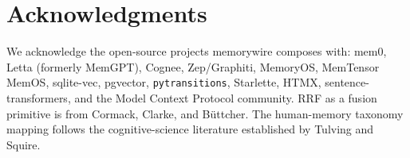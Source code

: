 \documentclass[11pt,letterpaper,twocolumn]{article}
\begin{document}
\section*{Acknowledgments}

We acknowledge the open-source projects memorywire composes with: mem0, Letta (formerly MemGPT), Cognee, Zep/Graphiti, MemoryOS, MemTensor MemOS, sqlite-vec, pgvector, \texttt{pytransitions}, Starlette, HTMX, sentence-transformers, and the Model Context Protocol community. RRF as a fusion primitive is from Cormack, Clarke, and B{\"u}ttcher. The human-memory taxonomy mapping follows the cognitive-science literature established by Tulving and Squire.



\end{document}
